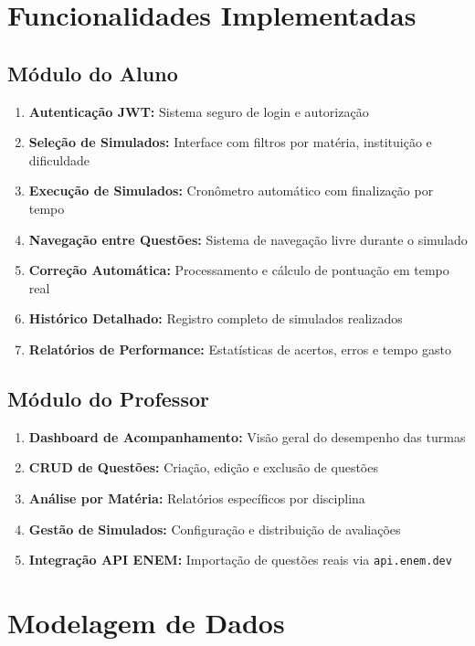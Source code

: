 \documentclass[12pt,a4paper]{article}
\begin{document}
\section{Funcionalidades Implementadas}

\subsection{Módulo do Aluno}
\begin{enumerate}
    \item \textbf{Autenticação JWT:} Sistema seguro de login e autorização
    \item \textbf{Seleção de Simulados:} Interface com filtros por matéria, instituição e dificuldade
    \item \textbf{Execução de Simulados:} Cronômetro automático com finalização por tempo
    \item \textbf{Navegação entre Questões:} Sistema de navegação livre durante o simulado
    \item \textbf{Correção Automática:} Processamento e cálculo de pontuação em tempo real
    \item \textbf{Histórico Detalhado:} Registro completo de simulados realizados
    \item \textbf{Relatórios de Performance:} Estatísticas de acertos, erros e tempo gasto
\end{enumerate}

\subsection{Módulo do Professor}
\begin{enumerate}
    \item \textbf{Dashboard de Acompanhamento:} Visão geral do desempenho das turmas
    \item \textbf{CRUD de Questões:} Criação, edição e exclusão de questões
    \item \textbf{Análise por Matéria:} Relatórios específicos por disciplina
    \item \textbf{Gestão de Simulados:} Configuração e distribuição de avaliações
    \item \textbf{Integração API ENEM:} Importação de questões reais via \texttt{api.enem.dev}
\end{enumerate}

\section{Modelagem de Dados}
\end{document}
